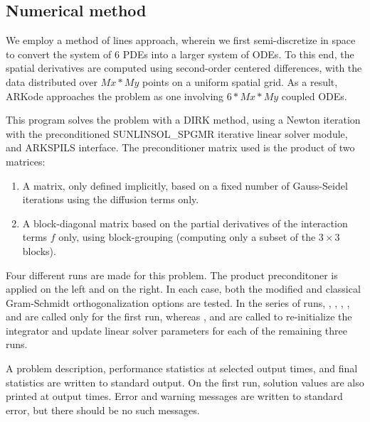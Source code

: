 \documentclass[letterpaper,10pt,english]{sphinxmanual}
\begin{document}
\subsection{Numerical method}
\label{\detokenize{c_serial:id32}}
We employ a method of lines approach, wherein we first semi-discretize
in space to convert the system of 6 PDEs into a larger system of ODEs.
To this end, the spatial derivatives are computed using second-order
centered differences, with the data distributed over \(Mx*My\)
points on a uniform spatial grid.  As a result, ARKode approaches the
problem as one involving \(6*Mx*My\) coupled ODEs.

This program solves the problem with a DIRK method, using a Newton
iteration with the preconditioned SUNLINSOL\_SPGMR iterative linear
solver module, and ARKSPILS interface.  The preconditioner matrix used
is the product of two matrices:
\begin{enumerate}
\item {} 
A matrix, only defined implicitly, based on a fixed number of
Gauss-Seidel iterations using the diffusion terms only.

\item {} 
A block-diagonal matrix based on the partial derivatives of the
interaction terms \(f\) only, using block-grouping (computing
only a subset of the \(3\times3\) blocks).

\end{enumerate}

Four different runs are made for this problem.  The product
preconditoner is applied on the left and on the right.  In each case,
both the modified and classical Gram-Schmidt orthogonalization options
are tested.  In the series of runs, , ,
, ,
 and  are called
only for the first run, whereas ,
 and  are called to
re-initialize the integrator and update linear solver parameters for
each of the remaining three runs.

A problem description, performance statistics at selected output
times, and final statistics are written to standard output.  On the
first run, solution values are also printed at output times.  Error
and warning messages are written to standard error, but there should
be no such messages.
\end{document}

